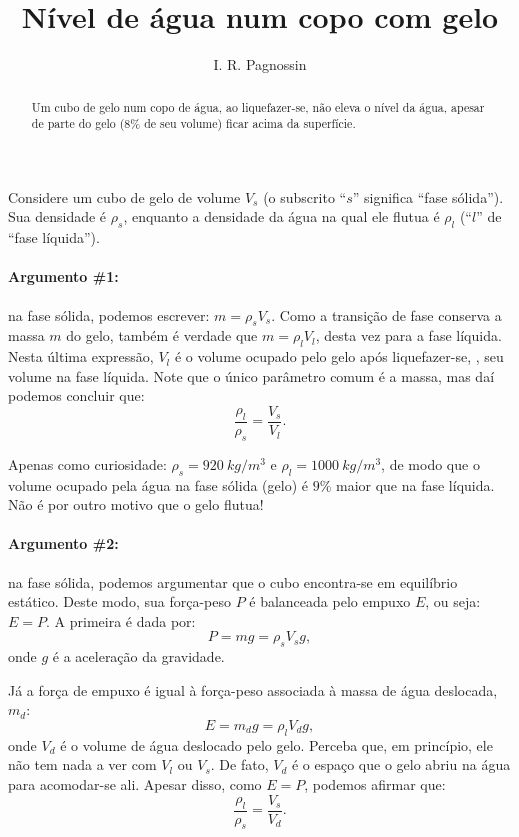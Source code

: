 \documentclass[a4paper,12pt]{article}
\title{Nível de água num copo com gelo}
\author{I. R. Pagnossin}
\begin{document}
\maketitle

\begin{abstract}
  Um cubo de gelo num copo de água, ao liquefazer-se, não eleva o nível da água, apesar de parte do gelo ($8\%$ de seu volume) ficar acima da superfície.
\end{abstract}

  Considere um cubo de gelo de volume $V_{s}$ (o subscrito ``$s$'' significa ``fase sólida'').
  Sua densidade é $\rho_{s}$, enquanto a densidade da água na qual ele flutua é $\rho_{l}$ (``$l$'' de ``fase líquida'').
  
  \paragraph{Argumento \#1:} na fase sólida, podemos escrever: $m = \rho_{s} V_{s}$.
  Como a transição de fase conserva a massa $m$ do gelo, também é verdade que $m = \rho_{l} V_{l}$, desta vez para a fase líquida.
  Nesta última expressão, $V_{l}$ é o volume ocupado pelo gelo após liquefazer-se, \ie, seu volume na fase líquida.
  Note que o único parâmetro comum é a massa, mas daí podemos concluir que:
  \begin{equation}\label{eq:relacao-1}
  \frac{\rho_{l}}{\rho_{s}} = \frac{V_{s}}{V_{l}}.
  \end{equation}
  
  Apenas como curiosidade: $\rho_{s} = \SI{920}{kg/m^3}$ e $\rho_{l} = \SI{1000}{kg/m^3}$, de modo que o volume ocupado pela água na fase sólida (gelo) é $9\%$ maior que na fase líquida. Não é por outro motivo que o gelo flutua!

  \paragraph{Argumento \#2:} na fase sólida, podemos argumentar que o cubo encontra-se em equilíbrio estático.
  Deste modo, sua força-peso $P$ é balanceada pelo empuxo $E$, ou seja: $E = P$.
  A primeira é dada por:
  \begin{equation*}
  P = mg = \rho_{s}V_{s}g,
  \end{equation*}
  onde $g$ é a aceleração da gravidade.
  
  Já a força de empuxo é igual à força-peso associada à massa de água deslocada, $m_{d}$:
  \begin{equation*}
  E = m_{d}g = \rho_{l} V_{d} g,
  \end{equation*}
  onde $V_{d}$ é o volume de água deslocado pelo gelo.
  Perceba que, em princípio, ele não tem nada a ver com $V_l$ ou $V_s$.
  De fato, $V_d$ é o espaço que o gelo abriu na água para acomodar-se ali.
  Apesar disso, como $E = P$, podemos afirmar que:
  \begin{equation}\label{eq:relacao-2}
  \frac{\rho_{l}}{\rho_{s}} = \frac{V_{s}}{V_{d}}.
  \end{equation}
  
\end{document}
